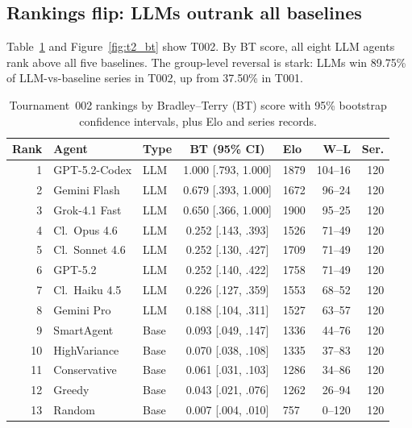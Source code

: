\documentclass[11pt]{article}
\newcommand{\tOne}{T001}
\newcommand{\tTwo}{T002}
\begin{document}
\subsection{Rankings flip: LLMs outrank all baselines}

Table~\ref{tab:t2_rank} and Figure~\ref{fig:t2_bt} show \tTwo.
By BT score, all eight LLM agents rank above all five baselines.
The group-level reversal is stark: LLMs win 89.75\% of LLM-vs-baseline series in \tTwo, up from 37.50\% in \tOne.

\begin{table}[t]
\centering
\small
\caption{Tournament~002 rankings by Bradley--Terry (BT) score with 95\% bootstrap confidence intervals, plus Elo and series records.}
\label{tab:t2_rank}
\begin{tabular}{rllclrr}
\toprule
Rank & Agent & Type & BT (95\% CI) & Elo & W--L & Ser. \\
\midrule
1 & GPT-5.2-Codex & LLM & 1.000 [.793, 1.000] & 1879 & 104--16 & 120 \\
2 & Gemini Flash & LLM & 0.679 [.393, 1.000] & 1672 & 96--24 & 120 \\
3 & Grok-4.1 Fast & LLM & 0.650 [.366, 1.000] & 1900 & 95--25 & 120 \\
4 & Cl.\ Opus 4.6 & LLM & 0.252 [.143, .393] & 1526 & 71--49 & 120 \\
5 & Cl.\ Sonnet 4.6 & LLM & 0.252 [.130, .427] & 1709 & 71--49 & 120 \\
6 & GPT-5.2 & LLM & 0.252 [.140, .422] & 1758 & 71--49 & 120 \\
7 & Cl.\ Haiku 4.5 & LLM & 0.226 [.127, .359] & 1553 & 68--52 & 120 \\
8 & Gemini Pro & LLM & 0.188 [.104, .311] & 1527 & 63--57 & 120 \\
9 & SmartAgent & Base & 0.093 [.049, .147] & 1336 & 44--76 & 120 \\
10 & HighVariance & Base & 0.070 [.038, .108] & 1335 & 37--83 & 120 \\
11 & Conservative & Base & 0.061 [.031, .103] & 1286 & 34--86 & 120 \\
12 & Greedy & Base & 0.043 [.021, .076] & 1262 & 26--94 & 120 \\
13 & Random & Base & 0.007 [.004, .010] & 757 & 0--120 & 120 \\
\bottomrule
\end{tabular}
\end{table}
\end{document}
